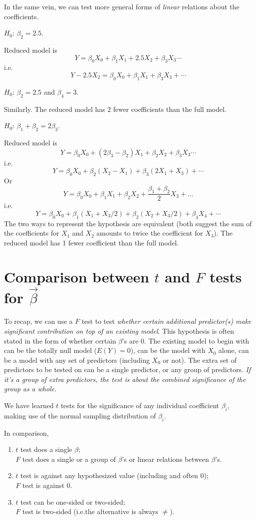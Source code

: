 \documentclass[12pt]{article}
\begin{document}
In the same vein, we can test more general forms of \emph{linear}
relations about the coefficients.

\example
$H_0$: $\beta_2 = 2.5$.

Reduced model is
\[
Y = \beta_0 X_0 + \beta_1 X_1 + 2.5 X_2 + \beta_3 X_3 \dotsb
\]
i.e.
\[
Y - 2.5 X_2 = \beta_0 X_0 + \beta_1 X_1 + \beta_3 X_3 + \dotsb
\]

\example
$H_0$: $\beta_2 = 2.5$ and $\beta_4 = 3$.

Similarly. The reduced model has 2 fewer coefficients than the full
model.

\example
$H_0$: $\beta_1 + \beta_2 = 2 \beta_3$.

Reduced model is
\[
Y = \beta_0 X_0 + (2\beta_3 - \beta_2) X_1 + \beta_2 X_2 + \beta_3 X_3 \dotsb
\]
i.e.
\[
Y = \beta_0 X_0 + \beta_2 (X_2 - X_1) + \beta_3 (2X_1 + X_3) + \dotsb
\]
Or
\[
Y = \beta_0 X_0 + \beta_1 X_1 + \beta_2 X_2 +
    \frac{\beta_1 + \beta_2}{2} X_3 + \dotsc
\]
i.e.
\[
Y = \beta_0 X_0 + \beta_1 (X_1 + X_3/2) + \beta_2 (X_2 + X_3/2)
    + \beta_4 X_4 + \dotsb
\]
The two ways to represent the hypothesis are equivalent
(both suggest the sum of the coefficients for $X_1$ and $X_2$
amounts to twice the coefficient for $X_3$).
The reduced model has 1 fewer coefficient than the full model.

\section{Comparison between $t$ and $F$ tests for $\vec\beta$}

To recap, we can use a $F$ test to test
\emph{whether certain additional predictor(s) make
significant contribution on top of an existing model}.
This hypothesis is often stated in the form of whether
certain $\beta$'s are 0.
The existing model to begin with can be the totally null model
($E(Y) = 0$), can be the model with $X_0$ alone,
can be a model with any set of predictors (including $X_0$ or not).
The extra set of predictors to be tested on can be a single predictor,
or any group of predictors.
\emph{If it's a group of extra predictors,
the test is about the combined significance of the group as a whole.}

We have learned $t$ tests for the significance of
any individual coefficient $\beta_i$,
making use of the normal sampling distribution of $\beta_i$.

In comparison,
\begin{enumerate}
\item
$t$ test does a single $\beta$;\\
$F$ test does a single or a group of $\beta$'s or linear relations
between $\beta$'s.

\item
$t$ test is against any hypothesized value (including and often 0);\\
$F$ test is against 0.

\item
$t$ test can be one-sided or two-sided;\\
$F$ test is two-sided (i.e.\@ the alternative is always $\ne$).
\end{enumerate}
\end{document}
